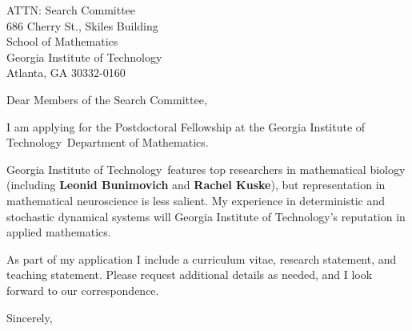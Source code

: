 \documentclass[11pt,a4paper]{letter}
\begin{document}

\def\School{Georgia Institute of Technology}

\begin{letter}
{ATTN: Search Committee\\
686 Cherry St., Skiles Building\\
School of Mathematics\\
Georgia Institute of Technology\\
Atlanta, GA 30332-0160
}


\opening{Dear Members of the Search Committee,}

I am applying for the Postdoctoral Fellowship at the \School~Department of Mathematics. 



\School~features top researchers in mathematical biology (including \textbf{Leonid Bunimovich} and \textbf{Rachel Kuske}), but representation in mathematical neuroscience is less salient. My experience in deterministic and stochastic dynamical systems will \School's reputation in applied mathematics.



As part of my application I include a curriculum vitae, research statement, and teaching statement. Please request additional details as needed, and I look forward to our correspondence.

\closing{Sincerely,}
\end{letter}
\end{document}
